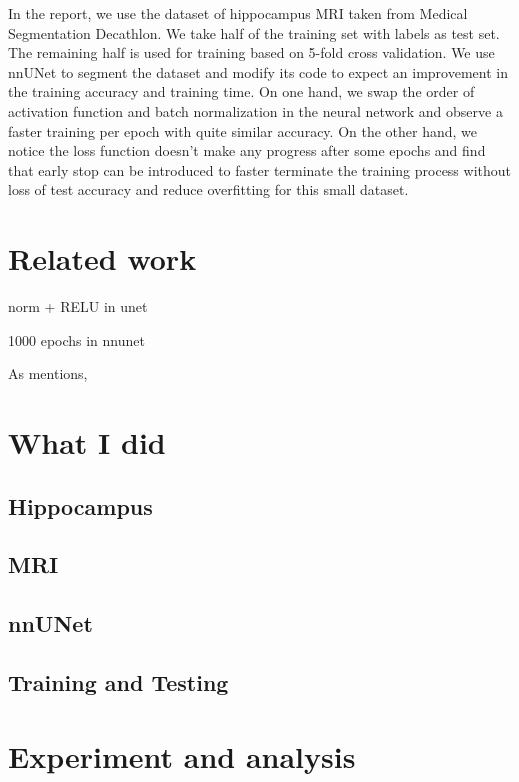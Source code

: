 \documentclass{article}
\begin{document}
In the report, we use the dataset of hippocampus MRI taken from Medical Segmentation Decathlon. We take half of the training set with labels as test set. The remaining half is used for training based on 5-fold cross validation. We use nnUNet to segment the dataset and modify its code to expect an improvement in the training accuracy and training time. On one hand, we swap the order of activation function and batch normalization in the neural network and observe a faster training per epoch with quite similar accuracy. On the other hand, we notice the loss function doesn't make any progress after some epochs and find that early stop can be introduced to faster terminate the training process without loss of test accuracy and reduce overfitting for this small dataset.

\section{Related work}

norm + RELU in unet

1000 epochs in nnunet

As \citet{isensee2021nnu} mentions, 


\section{What I did}

\subsection{Hippocampus}



\subsection{MRI}



\subsection{nnUNet}


\subsection{Training and Testing}



\section{Experiment and analysis}
\end{document}
